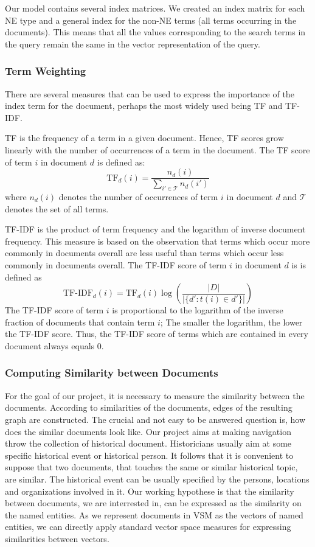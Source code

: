 Our model contains several index matrices. We created an index matrix for each NE type and a general index for the non-NE terms (all terms occurring in the documents). This means that all the values corresponding to the search terms in the query remain the same in the vector representation of the query.

\subsubsection{Term Weighting}
\label{sec:term_weighting}
There are several measures that can be used to express the importance of the index term for the document, perhaps the most widely used being TF and TF-IDF.

TF is the frequency of a term in a given document. Hence, TF scores grow linearly with the number of occurrences of a term in the document. The TF score of term $i$ in document $d$ is defined as:
\[\text{TF}_d(i) = \frac{n_d(i)}{\sum_{i' \in \mathcal{T}}{n_d(i')}}\]
where $n_d(i)$ denotes the number of occurrences of term $i$ in document $d$ and $\mathcal{T}$ denotes the set of all terms. 

TF-IDF is the product of term frequency and the logarithm of inverse document frequency. This measure is based on the observation that terms which occur more commonly in documents overall are less useful than terms which occur less commonly in documents overall. The TF-IDF score of term $i$ in document $d$ is is defined as
\[\text{TF-IDF}_d(i)= \text{TF}_d(i)\log{\left(\frac{|D|}{|\lbrace d' : t(i) \in d' \rbrace|}\right)}\]
The TF-IDF score of term $i$ is proportional to the logarithm of the inverse fraction of documents that contain term $i$; The smaller the logarithm, the lower the TF-IDF score. Thus, the TF-IDF score of terms which are contained in every document always equals $0$.

\subsubsection{Computing Similarity between Documents}\label{sec:computing_similarity_between_documents}

For the goal of our project, it is necessary to measure the similarity between the documents. According to similarities of the documents, edges of the resulting graph are constructed. The crucial and not easy to be answered question is, how does the similar documents look like. Our project aims at making navigation throw the collection of historical document. Historicians usually aim at some specific historical event or historical person. It follows that it is convenient to suppose that two documents, that touches the same or similar historical topic, are similar. The historical event can be usually specified by the persons, locations and organizations involved in it. Our working hypothese is that the similarity between documents, we are interrested in, can be expressed as the similarity on the named entities. As we represent documents in VSM as the vectors of named entities, we can directly apply standard vector space measures for expressing similarities between vectors. 

